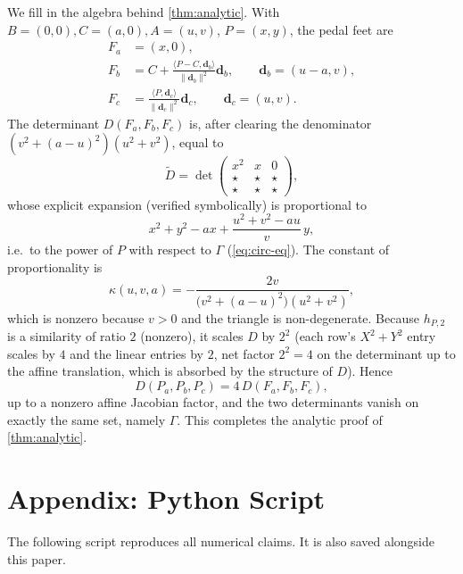 \documentclass[11pt,a4paper]{article}
\theoremstyle{definition}
\newcommand{\Pa}{P_{a}}
\newcommand{\Pb}{P_{b}}
\newcommand{\Pc}{P_{c}}
\newcommand{\Fa}{F_{a}}
\newcommand{\Fb}{F_{b}}
\newcommand{\Fc}{F_{c}}
\newcommand{\circc}{\Gamma}
\newcommand{\vv}[1]{\mathbf{#1}}
\begin{document}
We fill in the algebra behind \cref{thm:analytic}. With $B=(0,0),C=(a,0),A=(u,v)$, $P=(x,y)$, the pedal feet are
\begin{align}
\Fa&=(x,0),\\
\Fb&=C+\frac{\langle P-C,\vv d_{b}\rangle}{\|\vv d_{b}\|^{2}}\vv d_{b},\qquad \vv d_{b}=(u-a,v),\\
\Fc&=\frac{\langle P,\vv d_{c}\rangle}{\|\vv d_{c}\|^{2}}\vv d_{c},\qquad \vv d_{c}=(u,v).
\end{align}
The determinant $D(\Fa,\Fb,\Fc)$ is, after clearing the denominator $(v^{2}+(a-u)^{2})(u^{2}+v^{2})$, equal to
\begin{equation}\label{eq:det-pedal-full}
\widetilde D=\det\begin{pmatrix}x^{2}&x&0\\ \star & \star& \star\\ \star&\star&\star\end{pmatrix},
\end{equation}
whose explicit expansion (verified symbolically) is proportional to
\begin{equation}\label{eq:prop-power}
x^{2}+y^{2}-ax+\frac{u^{2}+v^{2}-au}{v}\,y,
\end{equation}
i.e.\ to the power of $P$ with respect to $\circc$ (\cref{eq:circ-eq}). The constant of proportionality is
\begin{equation}\label{eq:const-prop}
\kappa(u,v,a)=-\frac{2v}{\bigl(v^{2}+(a-u)^{2}\bigr)(u^{2}+v^{2})},
\end{equation}
which is nonzero because $v>0$ and the triangle is non-degenerate. Because $h_{P,2}$ is a similarity of ratio $2$ (nonzero), it scales $D$ by $2^{2}$ (each row's $X^{2}+Y^{2}$ entry scales by $4$ and the linear entries by $2$, net factor $2^{2}=4$ on the determinant up to the affine translation, which is absorbed by the structure of $D$). Hence
\begin{equation}\label{eq:det-relation}
D(\Pa,\Pb,\Pc)=4\,D(\Fa,\Fb,\Fc),
\end{equation}
up to a nonzero affine Jacobian factor, and the two determinants vanish on exactly the same set, namely $\circc$. This completes the analytic proof of \cref{thm:analytic}.

\section{Appendix: Python Script}\label{app:script}

The following script reproduces all numerical claims. It is also saved alongside this paper.
\end{document}
